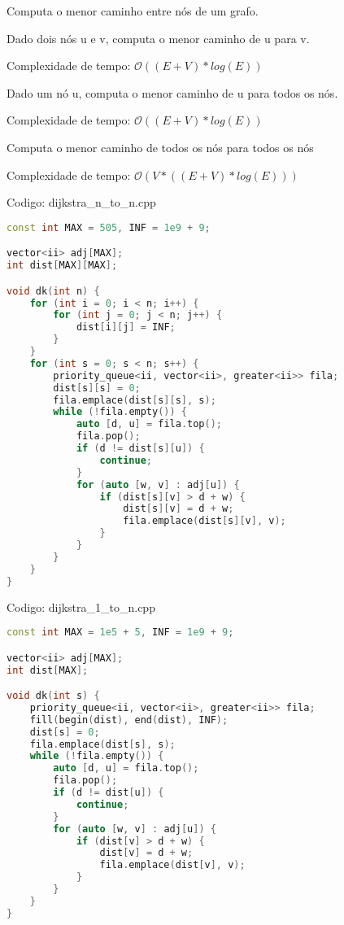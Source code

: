 \documentclass[10pt, a4paper, oneside]{book}
\begin{document}
Computa o menor caminho entre nós de um grafo.



\textbf{} 


Dado dois nós u e v, computa o menor caminho de u para v.



Complexidade de tempo: $\mathcal{O}((E + V) * log(E))$



\textbf{} 


Dado um nó u, computa o menor caminho de u para todos os nós.



Complexidade de tempo: $\mathcal{O}((E + V) * log(E))$



\textbf{} 


Computa o menor caminho de todos os nós para todos os nós



Complexidade de tempo: $\mathcal{O}(V * ((E + V) * log(E)))$

\hfill

Codigo: dijkstra\_n\_to\_n.cpp

\begin{lstlisting}[language=C++]
const int MAX = 505, INF = 1e9 + 9;

vector<ii> adj[MAX];
int dist[MAX][MAX];

void dk(int n) {
    for (int i = 0; i < n; i++) {
        for (int j = 0; j < n; j++) {
            dist[i][j] = INF;
        }
    }
    for (int s = 0; s < n; s++) {
        priority_queue<ii, vector<ii>, greater<ii>> fila;
        dist[s][s] = 0;
        fila.emplace(dist[s][s], s);
        while (!fila.empty()) {
            auto [d, u] = fila.top();
            fila.pop();
            if (d != dist[s][u]) {
                continue;
            }
            for (auto [w, v] : adj[u]) {
                if (dist[s][v] > d + w) {
                    dist[s][v] = d + w;
                    fila.emplace(dist[s][v], v);
                }
            }
        }
    }
}
\end{lstlisting}
\hfill

Codigo: dijkstra\_1\_to\_n.cpp

\begin{lstlisting}[language=C++]
const int MAX = 1e5 + 5, INF = 1e9 + 9;

vector<ii> adj[MAX];
int dist[MAX];

void dk(int s) {
    priority_queue<ii, vector<ii>, greater<ii>> fila;
    fill(begin(dist), end(dist), INF);
    dist[s] = 0;
    fila.emplace(dist[s], s);
    while (!fila.empty()) {
        auto [d, u] = fila.top();
        fila.pop();
        if (d != dist[u]) {
            continue;
        }
        for (auto [w, v] : adj[u]) {
            if (dist[v] > d + w) {
                dist[v] = d + w;
                fila.emplace(dist[v], v);
            }
        }
    }
}
\end{lstlisting}
\hfill
\end{document}
